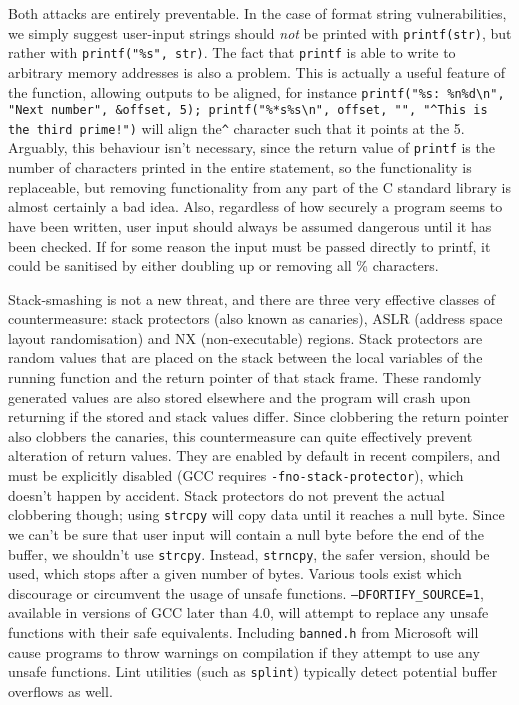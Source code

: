 Both attacks are entirely preventable. In the case of format string vulnerabilities, we simply suggest user-input
strings should \emph{not} be printed with {\tt printf(str)}, but rather with {\tt printf("\%s", str)}. The fact that
{\tt printf} is able to write to arbitrary memory addresses is also a problem. This is actually a useful feature of the
function, allowing outputs to be aligned, for instance {\tt printf("\%s: \%n\%d\textbackslash n", "Next number",
\&offset, 5); printf("\%*s\%s\textbackslash n", offset, "", "\textasciicircum This is the third prime!")} will align
the{\tt \textasciicircum} character such that it points at the 5. Arguably, this behaviour isn't necessary, since the
return value of {\tt printf} is the number of characters printed in the entire statement, so the functionality is
replaceable, but removing functionality from any part of the C standard library is almost certainly a bad idea. Also,
regardless of how securely a program seems to have been written, user input should always be assumed dangerous until it
has been checked. If for some reason the input must be passed directly to printf, it could be sanitised by either
doubling up or removing all \% characters.

Stack-smashing is not a new threat, and there are three very effective classes of countermeasure:
stack protectors (also known as canaries), ASLR (address space layout randomisation) and NX (non-executable) regions.
Stack protectors are random values that are placed on the stack between the local variables of the running function and
the return pointer of that stack frame. These randomly generated values are also stored elsewhere and the program will
crash upon returning if the stored and stack values differ. Since clobbering the return pointer also clobbers the
canaries, this countermeasure can quite effectively prevent alteration of return values. They are enabled by default in
recent compilers, and must be explicitly disabled (GCC requires {\tt -fno-stack-protector}), which doesn't happen by
accident. Stack protectors do not prevent the actual clobbering though; using {\tt strcpy} will copy data until
it reaches a null byte. Since we can't be sure that user input will contain a null byte before the end of the
buffer, we shouldn't use {\tt strcpy}. Instead, {\tt strncpy}, the safer version, should be used, which
stops after a given number of bytes. Various tools exist which discourage or circumvent the usage of unsafe functions.
{\tt --DFORTIFY\_SOURCE=1}\cite{fort_source}, available in versions of GCC later than 4.0, will attempt to replace any
unsafe functions with their safe equivalents. Including {\tt banned.h} from Microsoft\cite{banned} will cause programs
to throw warnings on compilation if they attempt to use any unsafe functions. Lint utilities (such as {\tt splint})
typically detect potential buffer overflows as well.

